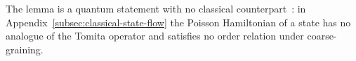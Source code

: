 \documentclass[a4paper,11pt]{article}
\theoremstyle{definition}
\newcommand{\mN}{\mathcal{N}}
\newcommand{\mH}{\mathcal{H}}
\newcommand{\mM}{\mathcal{M}}
\begin{document}
The lemma is a quantum statement with no classical counterpart~\cite{Lashkari2019Constraining,furuya2023information}: in Appendix~\ref{subsec:classical-state-flow} the Poisson Hamiltonian of a state has no analogue of the Tomita operator and satisfies no order relation under coarse-graining.
\end{document}
